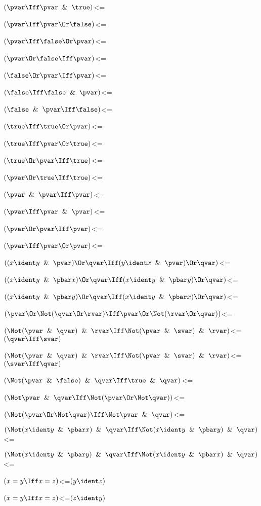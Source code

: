 $(\pvar \Iff \pvar \And \true)$<=

$(\pvar \Iff \pvar \Or \false)$<=

$(\pvar \Iff \false \Or \pvar)$<=

$(\pvar \Or \false \Iff \pvar)$<=

$(\false \Or \pvar \Iff \pvar)$<=

$(\false \Iff \false \And \pvar)$<=

$(\false \And \pvar \Iff \false)$<=

$(\true \Iff \true \Or \pvar)$<=

$(\true \Iff \pvar \Or \true)$<=

$(\true \Or \pvar \Iff \true)$<=

$(\pvar \Or \true \Iff \true)$<=

$(\pvar \And \pvar \Iff \pvar)$<=

$(\pvar \Iff \pvar \And \pvar)$<=

$(\pvar \Or \pvar \Iff \pvar)$<=

$(\pvar \Iff \pvar \Or \pvar)$<=

$((x \ident y \And \pvar) \Or \qvar \Iff (y \ident x \And \pvar) \Or \qvar)$<=

$((x \ident y \And \pbar x) \Or \qvar \Iff (x \ident y \And \pbar y) \Or \qvar)$<=

$((x \ident y \And \pbar y) \Or \qvar \Iff (x \ident y \And \pbar x) \Or \qvar)$<=

$(\pvar \Or \Not(\qvar \Or \rvar) \Iff \pvar \Or \Not(\rvar \Or \qvar))$<=

$(\Not(\pvar \And \qvar) \And \rvar \Iff \Not(\pvar \And \svar) \And \rvar)$<=$(\qvar \Iff \svar)$

$(\Not(\pvar \And \qvar) \And \rvar \Iff \Not(\pvar \And \svar) \And \rvar)$<=$(\svar \Iff \qvar)$

$(\Not(\pvar \And \false) \And \qvar \Iff \true \And \qvar)$<=

$(\Not \pvar \And \qvar \Iff \Not(\pvar \Or \Not \qvar))$<=

$(\Not(\pvar \Or \Not \qvar) \Iff \Not \pvar \And \qvar)$<=

$(\Not(x \ident y \And \pbar x) \And \qvar \Iff \Not(x \ident y \And \pbar y) \And \qvar)$<=

$(\Not(x \ident y \And \pbar y) \And \qvar \Iff \Not(x \ident y \And \pbar x) \And \qvar)$<=

$(x = y \Iff x = z)$<=$(y \ident z)$

$(x = y \Iff x = z)$<=$(z \ident y)$

